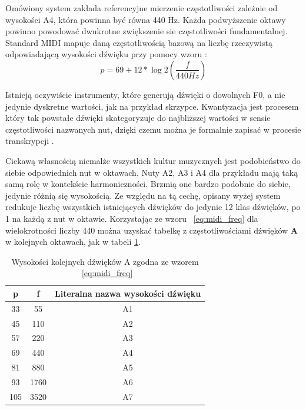\documentclass[12pt,a4paper,twoside]{mwart}
\begin{document}
Omówiony system zakłada referencyjne mierzenie częstotliwości zależnie od wysokości A4, która powinna być równa 440 Hz. Każda podwyższenie oktawy powinno powodować dwukrotne zwiększenie sie częstotliwości fundamentalnej. Standard MIDI mapuje daną częstotliwością bazową na liczbę rzeczywistą odpowiadającą wysokości dźwięku przy pomocy wzoru \cite[67-71]{Homerecording:LevelUp}:
\begin{equation} \label{eq:midi_freq}
p = 69 + 12 * \log{2}(\frac{f}{440 Hz})
\end{equation}

Istnieją oczywiście instrumenty, które generują dźwięki o dowolnych F0, a nie jedynie dyskretne wartości, jak na przykład skrzypce. Kwantyzacja jest procesem który tak powstałe dźwięki skategoryzuje do najbliższej wartości w sensie częstotliwości nazwanych nut, dzięki czemu można je formalnie zapisać w procesie transkrypcji \cite{Transcription:Burns:InversalScalesTuning}.

Ciekawą własnością niemalże wszystkich kultur muzycznych jest podobieństwo do siebie odpowiednich nut w oktawach. Nuty A2, A3 i A4 dla przykładu mają taką samą rolę w kontekście harmoniczności. Brzmią one bardzo podobnie do siebie, jedynie różnią się wysokością. Ze względu na tą cechę, opisany wyżej system redukuje liczbę wszystkich istniejących dźwięków do jedynie 12 klas dźwięków, po 1 na każdą z nut w oktawie. Korzystając ze wzoru ~\ref{eq:midi_freq} dla wielokrotności liczby 440 można uzyskać tabelkę z częstotliwościami dźwięków \textbf{A} w kolejnych oktawach, jak w tabeli \ref{tab:FqMidi}.

\begin{table}[H]
  \begin{center}
    \begin{tabular}{ |c|c|c| } 
    \hline
    p & f & Literalna nazwa wysokości dźwięku\\
    \hline
    33 & 55 & A1\\
    45 & 110 & A2\\
    57 & 220 & A3\\
    69 & 440 & A4\\
    81 & 880 & A5\\
    93 & 1760 & A6\\
    105 & 3520 & A7\\
    \hline
    \end{tabular}
  \end{center}
  \caption{Wysokości kolejnych dźwięków A zgodna ze wzorem ~\ref{eq:midi_freq}}
  \label{tab:FqMidi}
\end{table}
\end{document}
